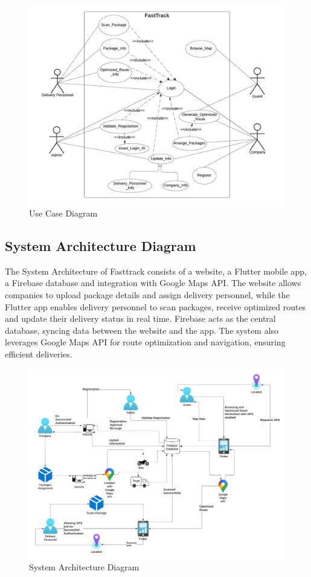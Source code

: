 \begin{figure}[H]  %
\centering
    \includegraphics[scale=0.6]{Use case diagram (3).jpeg}
    \caption{Use Case Diagram}
    \label{fig:use_case}
\end{figure}
\newpage
\subsection{System Architecture Diagram}
The System Architecture of Fasttrack consists of a website, a Flutter mobile app, a Firebase database and integration with Google Maps API. The website allows companies to upload package details and assign delivery personnel, while the Flutter app enables delivery personnel to scan packages, receive optimized routes and update their delivery status in real time. Firebase acts as the central database, syncing data between the website and the app. The system also leverages Google Maps API for route optimization and navigation, ensuring efficient deliveries.
\begin{figure}[H]  %
\centering
    \includegraphics[scale=0.5]{System Architecture.jpeg}
    \caption{System Architecture Diagram}
    \label{fig:system_architecture}
\end{figure}
\newpage
